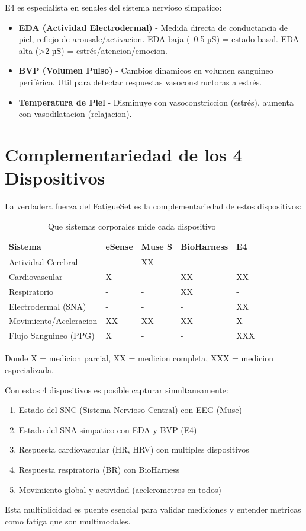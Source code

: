 E4 es especialista en senales del sistema nervioso simpatico:

\begin{itemize}
    \item \textbf{EDA (Actividad Electrodermal)} - Medida directa de conductancia de piel,
          reflejo de arousale/activacion. EDA baja (~0.5 µS) = estado basal. EDA alta
          (>2 µS) = estrés/atencion/emocion.

    \item \textbf{BVP (Volumen Pulso)} - Cambios dinamicos en volumen sanguineo periférico.
          Util para detectar respuestas vasoconstructoras a estrés.

    \item \textbf{Temperatura de Piel} - Disminuye con vasoconstriccion (estrés), aumenta
          con vasodilatacion (relajacion).
\end{itemize}

\section{Complementariedad de los 4 Dispositivos}

La verdadera fuerza del FatigueSet es la complementariedad de estos dispositivos:

\begin{table}[H]
\centering
\caption{Que sistemas corporales mide cada dispositivo}
\begin{tabular}{|l|l|l|l|l|}
\hline
\textbf{Sistema} & \textbf{eSense} & \textbf{Muse S} & \textbf{BioHarness} & \textbf{E4} \\
\hline
Actividad Cerebral & - & XX & - & - \\
\hline
Cardiovascular & X & - & XX & XX \\
\hline
Respiratorio & - & - & XX & - \\
\hline
Electrodermal (SNA) & - & - & - & XX \\
\hline
Movimiento/Aceleracion & XX & XX & XX & X \\
\hline
Flujo Sanguineo (PPG) & X & - & - & XXX \\
\hline
\end{tabular}
\end{table}

Donde X = medicion parcial, XX = medicion completa, XXX = medicion especializada.

Con estos 4 dispositivos es posible capturar simultaneamente:
\begin{enumerate}
    \item Estado del SNC (Sistema Nervioso Central) con EEG (Muse)
    \item Estado del SNA simpatico con EDA y BVP (E4)
    \item Respuesta cardiovascular (HR, HRV) con multiples dispositivos
    \item Respuesta respiratoria (BR) con BioHarness
    \item Movimiento global y actividad (acelerometros en todos)
\end{enumerate}

Esta multiplicidad es puente esencial para validar mediciones y entender metricas
como fatiga que son multimodales.
